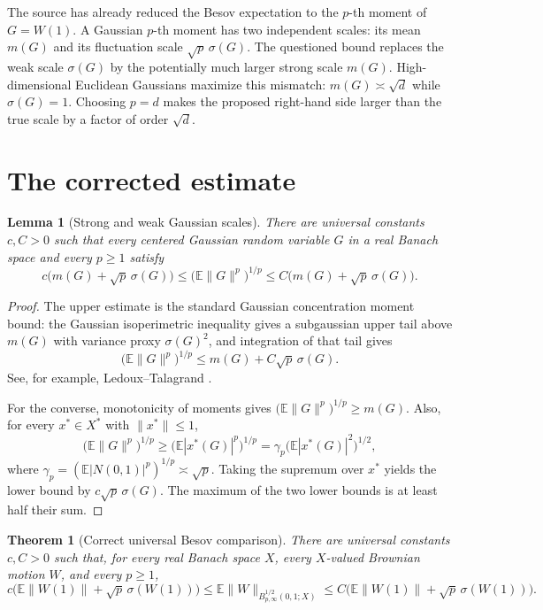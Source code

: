 \documentclass[11pt]{article}
\newtheorem{theorem}{Theorem}
\newtheorem{lemma}{Lemma}
\newcommand{\E}{\mathbb E}
\newcommand{\Besov}{B^{1/2}_{p,\infty}(0,1;X)}
\begin{document}
The source has already reduced the Besov expectation to the $p$-th moment of
$G=W(1)$. A Gaussian $p$-th moment has two independent scales: its mean
$m(G)$ and its fluctuation scale $\sqrt p\,\sigma(G)$. The questioned bound
replaces the weak scale $\sigma(G)$ by the potentially much larger strong
scale $m(G)$. High-dimensional Euclidean Gaussians maximize this mismatch:
$m(G)\asymp\sqrt d$ while $\sigma(G)=1$. Choosing $p=d$ makes the proposed
right-hand side larger than the true scale by a factor of order $\sqrt d$.

\section{The corrected estimate}

\begin{lemma}[Strong and weak Gaussian scales]\label{lem:gaussian}
There are universal constants $c,C>0$ such that every centered Gaussian
random variable $G$ in a real Banach space and every $p\ge1$ satisfy
\[
 c\bigl(m(G)+\sqrt p\,\sigma(G)\bigr)
 \le \bigl(\E\|G\|^p\bigr)^{1/p}
 \le C\bigl(m(G)+\sqrt p\,\sigma(G)\bigr).
\]
\end{lemma}

\begin{proof}
The upper estimate is the standard Gaussian concentration moment bound: the
Gaussian isoperimetric inequality gives a subgaussian upper tail above
$m(G)$ with variance proxy $\sigma(G)^2$, and integration of that tail gives
\[
 \bigl(\E\|G\|^p\bigr)^{1/p}
 \le m(G)+C\sqrt p\,\sigma(G).
\]
See, for example, Ledoux--Talagrand \cite[Chapter~3]{LT}.

For the converse, monotonicity of moments gives
$\bigl(\E\|G\|^p\bigr)^{1/p}\ge m(G)$. Also, for every
$x^*\in X^*$ with $\|x^*\|\le1$,
\[
 \bigl(\E\|G\|^p\bigr)^{1/p}
 \ge \bigl(\E|x^*(G)|^p\bigr)^{1/p}
 =\gamma_p\bigl(\E|x^*(G)|^2\bigr)^{1/2},
\]
where $\gamma_p=(\E|N(0,1)|^p)^{1/p}\asymp\sqrt p$. Taking the supremum
over $x^*$ yields the lower bound by $c\sqrt p\,\sigma(G)$. The maximum of
the two lower bounds is at least half their sum.
\end{proof}

\begin{theorem}[Correct universal Besov comparison]\label{thm:correct}
There are universal constants $c,C>0$ such that, for every real Banach space
$X$, every $X$-valued Brownian motion $W$, and every $p\ge1$,
\[
 c\bigl(\E\|W(1)\|+\sqrt p\,\sigma(W(1))\bigr)
 \le \E\|W\|_{\Besov}
 \le C\bigl(\E\|W(1)\|+\sqrt p\,\sigma(W(1))\bigr).
\]
\end{theorem}
\end{document}
